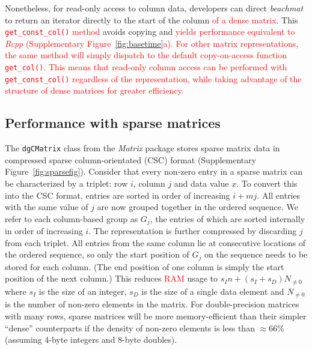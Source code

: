 \documentclass{article}
\newcommand{\beachmat}{\textit{beachmat}}
\newcommand{\code}[1]{\texttt{#1}}
\newcommand{\revised}[1]{\textcolor{red}{#1}}
\begin{document}
Nonetheless, for read-only access to column data, developers can direct \beachmat{} to return an iterator directly to the start of the column \revised{of a dense matrix}.
This \revised{\code{get\_const\_col()} method} avoids copying and \revised{yields performance equivalent to \textit{Rcpp} (Supplementary Figure~\ref{fig:basetime}a).
For other matrix representations, the same method will simply dispatch to the default copy-on-access function \code{get\_col()}.
This means that read-only column access can be performed with \code{get\_const\_col()} regardless of the representation, while taking advantage of the structure of dense matrices for greater efficiency.}

\subsection{Performance with sparse matrices}
The \code{dgCMatrix} class from the \textit{Matrix} package stores sparse matrix data in compressed sparse column-orientated (CSC) format (Supplementary Figure~\ref{fig:sparsefig}).
Consider that every non-zero entry in a sparse matrix can be characterized by a triplet: row $i$, column $j$ and data value $x$.
To convert this into the CSC format, entries are sorted in order of increasing $i + mj$.
All entries with the same value of $j$ are now grouped together in the ordered sequence.
We refer to each column-based group as $G_j$, the entries of which are sorted internally in order of increasing $i$.
The representation is further compressed by discarding $j$ from each triplet.
All entries from the same column lie at consecutive locations of the ordered sequence, so only the start position of $G_j$ on the sequence needs to be stored for each column.
(The end position of one column is simply the start position of the next column.)
This reduces \revised{RAM} usage to $s_In + (s_I + s_D) N_{\ne 0}$ where $s_I$ is the size of an integer, $s_D$ is the size of a single data element and $N_{\ne 0}$ is the number of non-zero elements in the matrix.
For double-precision matrices with many rows, sparse matrices will be more memory-efficient than their simpler ``dense'' counterparts if the density of non-zero elements is less than $\approx66$\% (assuming 4-byte integers and 8-byte doubles). 

\end{document}
